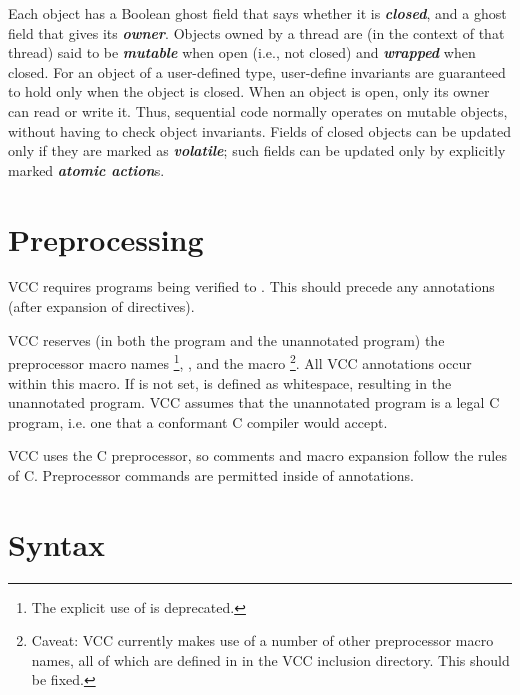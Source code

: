 \documentclass[preprint,nocopyrightspace]{sigplanconf}
\newcommand{\Def}[1]{\textit{\textbf{#1}}}
\begin{document}
Each object has a Boolean ghost field that says whether it
is \Def{closed}, and a ghost field that gives its \Def{owner}. Objects
owned by a thread are (in the context of that thread) said to
be \Def{mutable} when open (i.e., not closed) and \Def{wrapped} when
closed. For an object of a user-defined type, user-define invariants
are guaranteed to hold only when the object is closed.  When an object
is open, only its owner can read or write it. Thus, sequential code
normally operates on mutable objects, without having to check object
invariants. Fields of closed objects can be updated only if they are
marked as \Def{volatile}; such fields can be updated only by
explicitly marked \Def{atomic action}s. 



\section{Preprocessing}

VCC requires programs being verified to . This
should precede any annotations (after expansion of 
directives). 
 
VCC reserves (in both the program and the unannotated program) the
preprocessor macro names \footnote{ The explicit use
of  is deprecated.  }, , and the
macro \footnote{ Caveat: VCC currently makes use of a
number of other preprocessor macro names, all of which are defined
in  in the VCC inclusion directory. This should be
fixed.  }.  All VCC annotations occur within this
macro. If  is not set, \vcc{_()} is defined as whitespace,
resulting in the unannotated program. VCC assumes that the unannotated
program is a legal C program, i.e. one that a conformant C compiler
would accept.

VCC uses the C preprocessor, so comments and macro expansion follow
the rules of C. Preprocessor commands are permitted inside of annotations.

\section{Syntax}
\end{document}

